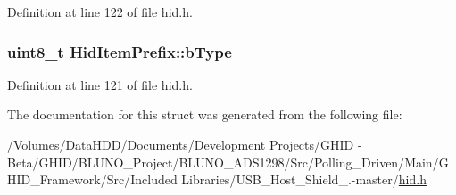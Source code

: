 \-Definition at line 122 of file hid.\-h.

\hypertarget{struct_hid_item_prefix_a16874c73fdb809e4c46407ca83684927}{
\subsubsection[{b\-Type}]{\setlength{\rightskip}{0pt plus 5cm}uint8\-\_\-t {\bf \-Hid\-Item\-Prefix\-::b\-Type}}}\label{struct_hid_item_prefix_a16874c73fdb809e4c46407ca83684927}


\-Definition at line 121 of file hid.\-h.



\-The documentation for this struct was generated from the following file\-:\begin{DoxyCompactItemize}
\item 
/\-Volumes/\-Data\-H\-D\-D/\-Documents/\-Development Projects/\-G\-H\-I\-D -\/ Beta/\-G\-H\-I\-D/\-B\-L\-U\-N\-O\-\_\-\-Project/\-B\-L\-U\-N\-O\-\_\-\-A\-D\-S1298/\-Src/\-Polling\-\_\-\-Driven/\-Main/\-G\-H\-I\-D\-\_\-\-Framework/\-Src/\-Included Libraries/\-U\-S\-B\-\_\-\-Host\-\_\-\-Shield\-\_.-\/master/\hyperlink{hid_8h}{hid.\-h}\end{DoxyCompactItemize}
